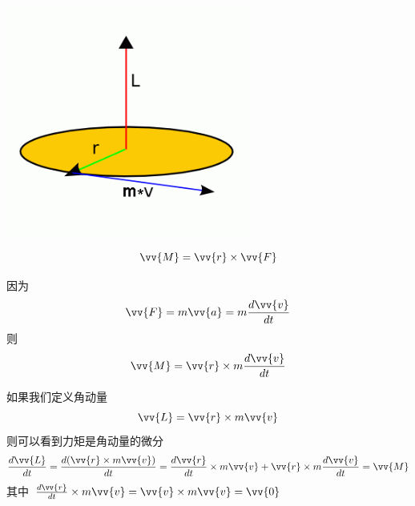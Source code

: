 \documentclass[11pt]{article}
\begin{document}
\begin{center}
\includegraphics[width=0.6\textwidth]{images/angularmomentum.png}
\end{center}

$$
\vv{M} = \vv{r} \times \vv{F}
$$

因为
$$
\vv{F} = m \vv{a} = m \frac{d\vv{v}}{dt}
$$
则
$$
\vv{M} = \vv{r} \times m \frac{d\vv{v}}{dt}
$$

如果我们定义角动量
$$
\vv{L} = \vv{r} \times m \vv{v}
$$
则可以看到力矩是角动量的微分
$$
\frac{d\vv{L}}{dt} = \frac{d(\vv{r} \times m \vv{v})}{dt} = \frac{d\vv{r}}{dt} \times m \vv{v} + \vv{r}\times m\frac{d\vv{v}}{dt} = \vv{M}
$$
其中
$
\frac{d\vv{r}}{dt} \times m \vv{v} = \vv{v} \times m \vv{v} = \vv{0} 
$
\end{document}
